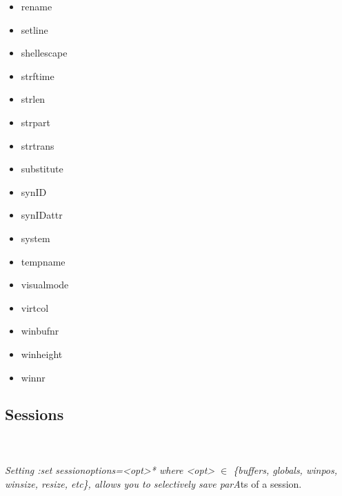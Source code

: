 \begin{multicols}{3}
\begin{itemize}[label={}]
    \item rename
    \item setline
    \item shellescape
    \item strftime
    \item strlen
    \item strpart
    \item strtrans
    \item substitute
    \item synID
    \item synIDattr
    \item system
    \item tempname
    \item visualmode
    \item virtcol
    \item winbufnr
    \item winheight
    \item winnr
\end{itemize}

\end{multicols}


\subsection*{Sessions}

\\
\\
\textit{Setting :set sessionoptions=<opt>* where <opt> $\in$ \{buffers, globals, winpos, winsize, resize, etc\}, allows you to selectively save parA}ts of a session.

\ \\